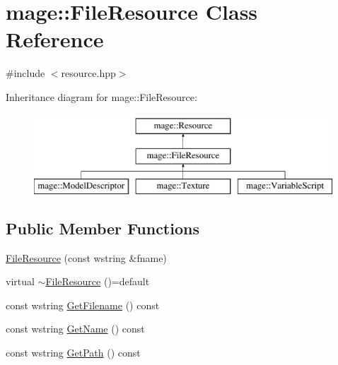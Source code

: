 \hypertarget{classmage_1_1_file_resource}{}\section{mage\+:\+:File\+Resource Class Reference}
\label{classmage_1_1_file_resource}


{\ttfamily \#include $<$resource.\+hpp$>$}

Inheritance diagram for mage\+:\+:File\+Resource\+:\begin{figure}[H]
\begin{center}
\leavevmode
\includegraphics[height=3.000000cm]{classmage_1_1_file_resource}
\end{center}
\end{figure}
\subsection*{Public Member Functions}
\begin{DoxyCompactItemize}
\item 
\hyperlink{classmage_1_1_file_resource_ab126d9301d81c55b2aaacff86437e2d4}{File\+Resource} (const wstring \&fname)
\item 
virtual \hyperlink{classmage_1_1_file_resource_a91ed639ff33311ebdfb54c80be7d6f62}{$\sim$\+File\+Resource} ()=default
\item 
const wstring \hyperlink{classmage_1_1_file_resource_acdd02b3c226777fd003d8f56e0a5cc83}{Get\+Filename} () const
\item 
const wstring \hyperlink{classmage_1_1_file_resource_a8bc3308e018b352157bbcfe3a85519f9}{Get\+Name} () const
\item 
const wstring \hyperlink{classmage_1_1_file_resource_a6dd2da5d50dbe8b3ac4189cdaa5fc325}{Get\+Path} () const
\end{DoxyCompactItemize}
